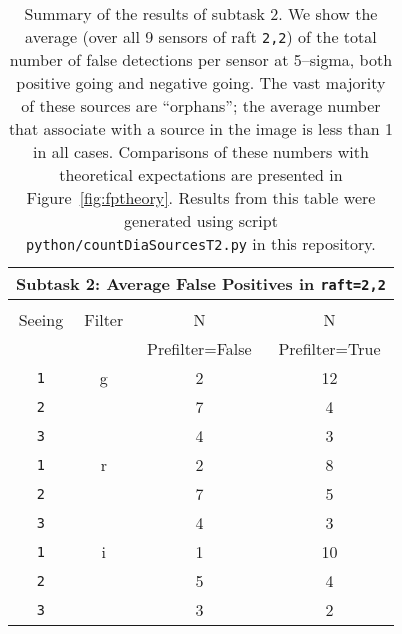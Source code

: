 \documentclass[prd, nofootinbib, floatfix, 11pt, tightenlines, times]{article}
\begin{document}
\begin{table}
\centering
\begin{tabular}{cccc}
\hline
\multicolumn{4}{|c|}{Subtask 2: Average False Positives in {\tt raft=2,2}} \\ \hline \\
Seeing   & Filter & N & N  \\
         &        & Prefilter=False & Prefilter=True   \\
\hline
{\tt 1}  & g      & 2 & 12    \\
{\tt 2}  &        & 7 & 4    \\
{\tt 3}  &        & 4 & 3    \\
\hline
{\tt 1}  & r      & 2 & 8    \\
{\tt 2}  &        & 7 & 5    \\
{\tt 3}  &        & 4 & 3    \\
\hline
{\tt 1}  & i      & 1 & 10    \\
{\tt 2}  &        & 5 & 4    \\
{\tt 3}  &        & 3 & 2    \\
\end{tabular}
\caption[]{Summary of the results of subtask 2.  We show the average
  (over all 9 sensors of raft {\tt 2,2}) of the total number of false
  detections per sensor at 5--sigma, both positive going and negative
  going.  The vast majority of these sources are ``orphans''; the
  average number that associate with a source in the image is less
  than 1 in all cases.  Comparisons of these numbers with theoretical
  expectations are presented in Figure~\ref{fig:fptheory}.  Results
  from this table were generated using script {\tt
    python/countDiaSourcesT2.py} in this repository.}
\label{tab:task2}
\end{table}



\end{document}

